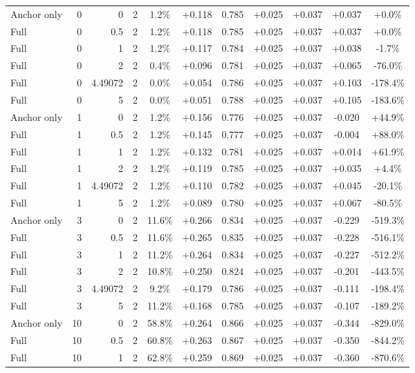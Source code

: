 \begin{table}[htbp]
\begin{tabular}{lrrrccccccc}
Anchor only & 0 & 0 & 2 & 1.2\% & +0.118 & 0.785 & +0.025 & +0.037 & +0.037 & +0.0\% \\
Full & 0 & 0.5 & 2 & 1.2\% & +0.118 & 0.785 & +0.025 & +0.037 & +0.037 & +0.0\% \\
Full & 0 & 1 & 2 & 1.2\% & +0.117 & 0.784 & +0.025 & +0.037 & +0.038 & -1.7\% \\
Full & 0 & 2 & 2 & 0.4\% & +0.096 & 0.781 & +0.025 & +0.037 & +0.065 & -76.0\% \\
Full & 0 & 4.49072 & 2 & 0.0\% & +0.054 & 0.786 & +0.025 & +0.037 & +0.103 & -178.4\% \\
Full & 0 & 5 & 2 & 0.0\% & +0.051 & 0.788 & +0.025 & +0.037 & +0.105 & -183.6\% \\
Anchor only & 1 & 0 & 2 & 1.2\% & +0.156 & 0.776 & +0.025 & +0.037 & -0.020 & +44.9\% \\
Full & 1 & 0.5 & 2 & 1.2\% & +0.145 & 0.777 & +0.025 & +0.037 & -0.004 & +88.0\% \\
Full & 1 & 1 & 2 & 1.2\% & +0.132 & 0.781 & +0.025 & +0.037 & +0.014 & +61.9\% \\
Full & 1 & 2 & 2 & 1.2\% & +0.119 & 0.785 & +0.025 & +0.037 & +0.035 & +4.4\% \\
Full & 1 & 4.49072 & 2 & 1.2\% & +0.110 & 0.782 & +0.025 & +0.037 & +0.045 & -20.1\% \\
Full & 1 & 5 & 2 & 1.2\% & +0.089 & 0.780 & +0.025 & +0.037 & +0.067 & -80.5\% \\
Anchor only & 3 & 0 & 2 & 11.6\% & +0.266 & 0.834 & +0.025 & +0.037 & -0.229 & -519.3\% \\
Full & 3 & 0.5 & 2 & 11.6\% & +0.265 & 0.835 & +0.025 & +0.037 & -0.228 & -516.1\% \\
Full & 3 & 1 & 2 & 11.2\% & +0.264 & 0.834 & +0.025 & +0.037 & -0.227 & -512.2\% \\
Full & 3 & 2 & 2 & 10.8\% & +0.250 & 0.824 & +0.025 & +0.037 & -0.201 & -443.5\% \\
Full & 3 & 4.49072 & 2 & 9.2\% & +0.179 & 0.786 & +0.025 & +0.037 & -0.111 & -198.4\% \\
Full & 3 & 5 & 2 & 11.2\% & +0.168 & 0.785 & +0.025 & +0.037 & -0.107 & -189.2\% \\
Anchor only & 10 & 0 & 2 & 58.8\% & +0.264 & 0.866 & +0.025 & +0.037 & -0.344 & -829.0\% \\
Full & 10 & 0.5 & 2 & 60.8\% & +0.263 & 0.867 & +0.025 & +0.037 & -0.350 & -844.2\% \\
Full & 10 & 1 & 2 & 62.8\% & +0.259 & 0.869 & +0.025 & +0.037 & -0.360 & -870.6\% \\

\end{tabular}
\end{table}
